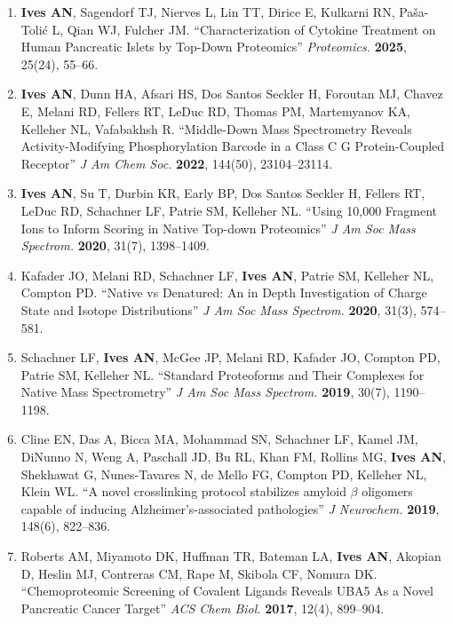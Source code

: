 \documentclass[10pt, letterpaper]{article}
\begin{document}
\begin{enumerate}[leftmargin=*, label=\arabic*., topsep=2pt, itemsep=3pt]
  \item \textbf{Ives AN}, Sagendorf TJ, Nierves L, Lin TT, Dirice E, Kulkarni RN, Pa\v{s}a-Toli\'{c} L,
  Qian WJ, Fulcher JM. ``Characterization of Cytokine Treatment on Human Pancreatic Islets by Top-Down
  Proteomics'' \textit{Proteomics.} \textbf{2025}, 25(24), 55--66.

  \item \textbf{Ives AN}, Dunn HA, Afsari HS, Dos Santos Seckler H, Foroutan MJ, Chavez E, Melani RD,
  Fellers RT, LeDuc RD, Thomas PM, Martemyanov KA, Kelleher NL, Vafabakhsh R. ``Middle-Down Mass
  Spectrometry Reveals Activity-Modifying Phosphorylation Barcode in a Class C G Protein-Coupled
  Receptor'' \textit{J Am Chem Soc.} \textbf{2022}, 144(50), 23104--23114.

  \item \textbf{Ives AN}, Su T, Durbin KR, Early BP, Dos Santos Seckler H, Fellers RT, LeDuc RD,
  Schachner LF, Patrie SM, Kelleher NL. ``Using 10,000 Fragment Ions to Inform Scoring in Native
  Top-down Proteomics'' \textit{J Am Soc Mass Spectrom.} \textbf{2020}, 31(7), 1398--1409.

  \item Kafader JO, Melani RD, Schachner LF, \textbf{Ives AN}, Patrie SM, Kelleher NL, Compton PD.
  ``Native vs Denatured: An in Depth Investigation of Charge State and Isotope Distributions''
  \textit{J Am Soc Mass Spectrom.} \textbf{2020}, 31(3), 574--581.

  \item Schachner LF, \textbf{Ives AN}, McGee JP, Melani RD, Kafader JO, Compton PD, Patrie SM,
  Kelleher NL. ``Standard Proteoforms and Their Complexes for Native Mass Spectrometry''
  \textit{J Am Soc Mass Spectrom.} \textbf{2019}, 30(7), 1190--1198.

  \item Cline EN, Das A, Bicca MA, Mohammad SN, Schachner LF, Kamel JM, DiNunno N, Weng A,
  Paschall JD, Bu RL, Khan FM, Rollins MG, \textbf{Ives AN}, Shekhawat G, Nunes-Tavares N,
  de Mello FG, Compton PD, Kelleher NL, Klein WL. ``A novel crosslinking protocol stabilizes amyloid
  $\beta$ oligomers capable of inducing Alzheimer's-associated pathologies'' \textit{J Neurochem.}
  \textbf{2019}, 148(6), 822--836.

  \item Roberts AM, Miyamoto DK, Huffman TR, Bateman LA, \textbf{Ives AN}, Akopian D, Heslin MJ,
  Contreras CM, Rape M, Skibola CF, Nomura DK. ``Chemoproteomic Screening of Covalent Ligands
  Reveals UBA5 As a Novel Pancreatic Cancer Target'' \textit{ACS Chem Biol.} \textbf{2017}, 12(4), 899--904.

\end{enumerate}
\end{document}
